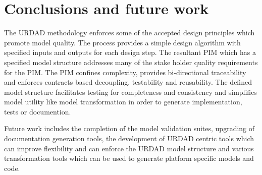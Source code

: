 \section{Conclusions and future work}
\label{sec:conclusions}

The URDAD methodology enforces some of the accepted design principles which promote model quality. The process provides a simple design algorithm with specified inputs and outputs for each design step. The resultant PIM which has a specified model structure addresses many of the stake holder quality requirements for the PIM. The PIM  confines complexity, provides bi-directional traceability and enforces contracts based decoupling,  testability and reusability. The defined model structure facilitates testing for completeness and consistency and simplifies model utility like model transformation in order to generate implementation, tests or documention.

Future work includes the completion of the model validation suites, upgrading of documentation generation tools, the development of URDAD centric tools which can improve flexibility and can enforce the URDAD model structure and various transformation tools which can be used to generate platform specific models and code.